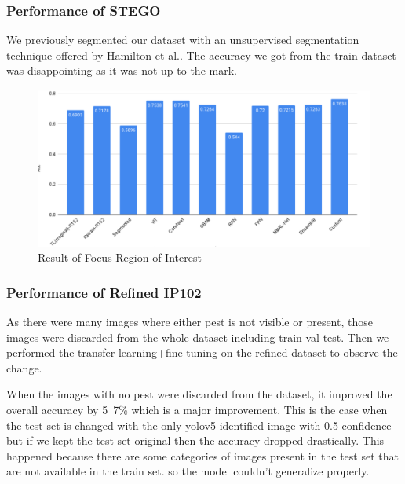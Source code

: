 \subsubsection{Performance of STEGO}
We previously segmented our dataset with an unsupervised segmentation technique offered by Hamilton et al.\cite{hamilton2022unsupervised}. The accuracy we got from the train dataset was disappointing as it was not up to the mark.


\begin{figure}
    \centering
    \includegraphics[scale=.5]{figures/Screenshot 2023-05-19 at 4.57.16 AM.png}
    \caption{Result of Focus Region of Interest}
    \label{fig:my_label}
\end{figure}

\subsubsection{Performance of Refined IP102}
As there were many images where either pest is not visible or present, those images were discarded from the whole dataset including train-val-test. Then we performed the transfer learning+fine tuning on the refined dataset to observe the change.

When the images with no pest were discarded from the dataset, it improved the overall accuracy by 5~7\% which is a major improvement. This is the case when the test set is changed with the only yolov5 identified image with 0.5 confidence but if we kept the test set original then the accuracy dropped drastically. This happened because there are some categories of images present in the test set that are not available in the train set. so the model couldn’t generalize properly.


